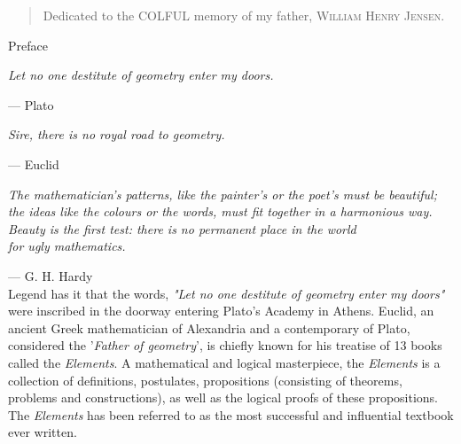 \documentclass[twoside,11pt]{report}
\begin{document}
\thispagestyle{empty}

\vspace*{\fill}
\begin{quote}
  \centering
  \Large{Dedicated to the \textsc{COL{\color{cred}{O}}{\color{cblue}{U}}{\color{cyellow}{R}}FUL} memory of my father, \LARGE{\textsc{William Henry Jensen}}.}\\
\end{quote}
\vspace*{\fill}
\newpage

\centerline{\LARGE{Preface}}

\hfill

\normalsize %


\hspace{2em}\textit{Let no one destitute of geometry enter my doors.}

\hspace{16em} --- Plato

\hfill

\begin{center}
  \textit{Sire, there is no royal road to geometry.}

  \hspace{10.5em}--- Euclid
\end{center}

\hfill

\begin{flushright}
  \textit{The mathematician's patterns, like the painter's or the poet's must be beautiful;}
  \textit{the ideas like the colours or the words, must fit together in a harmonious way.}
  \textit{Beauty is the first test: there is no permanent place in the world}\\
  \textit{for ugly mathematics.}
\end{flushright}

\hfill --- G. H. Hardy\\

Legend has it that the words, \textit{"Let no one destitute of geometry enter my doors"} were inscribed in the doorway entering Plato's Academy in Athens.  Euclid, an ancient Greek mathematician of Alexandria and a contemporary of Plato, considered the '\textit{Father of geometry}', is chiefly known for his treatise of 13 books called the \textit{Elements}.  A mathematical and logical masterpiece, the \textit{Elements} is a collection of definitions, postulates, propositions (consisting of theorems, problems and constructions), as well as the logical proofs of these propositions.  The \textit{Elements} has been referred to as the most successful and influential textbook ever written.
\end{document}
